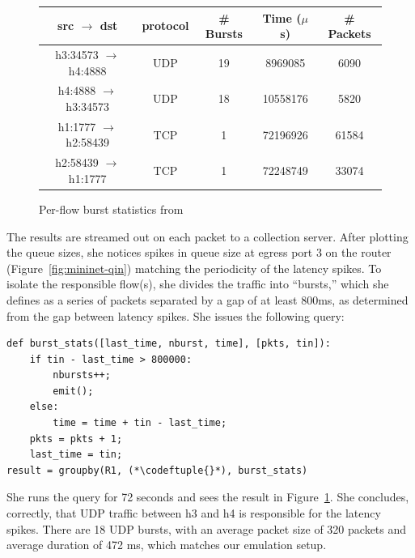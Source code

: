 \begin{figure}[t]
\vspace{0.083in}
\centering
\small
\begin{tabular}{c c c c c} \hline
\textbf{src $\rightarrow$ dst} & \textbf{protocol} & \textbf{\# Bursts} & \textbf{Time ($\mu$s)} & \textbf{\# Packets} \\ \hline \hline
h3:34573 $\rightarrow$ h4:4888 & UDP & 19 & 8969085 & 6090  \\ \hline
h4:4888 $\rightarrow$ h3:34573 & UDP & 18 & 10558176 & 5820 \\ \hline
h1:1777 $\rightarrow$ h2:58439 & TCP & 1 & 72196926 & 61584 \\ \hline
h2:58439 $\rightarrow$ h1:1777 & TCP & 1 & 72248749 & 33074 \\ \hline
\end{tabular}
\vspace{-0.1in}
\caption{Per-flow burst statistics from \TheSystem}
\label{fig:mininet-flowstats}
\vspace{-0.1in}
\end{figure}

The results are streamed out on each packet to a collection server. After
plotting the queue sizes, she notices spikes in queue size at egress port 3 on
the router (Figure~\ref{fig:mininet-qin}) matching the periodicity of the
latency spikes. To isolate the responsible flow(s), she divides the traffic
into ``bursts,'' which she defines as a series of packets separated by a gap of
at least 800ms, as determined from the gap between latency spikes. She issues
the following \TheSystem query:

\begin{small}
\begin{lstlisting}
def burst_stats([last_time, nburst, time], [pkts, tin]):
    if tin - last_time > 800000:
        nbursts++;
        emit();
    else:
        time = time + tin - last_time;
    pkts = pkts + 1;
    last_time = tin;
result = groupby(R1, (*\codeftuple{}*), burst_stats)
\end{lstlisting}
\end{small}

She runs the query for 72 seconds and sees the result in
Figure~\ref{fig:mininet-flowstats}. She concludes, correctly, that UDP traffic
between {\ct h3} and {\ct h4} is responsible for the latency spikes.  There are
18 UDP bursts, with an average packet size of 320 packets and average duration
of 472 ms, which matches our emulation setup.

